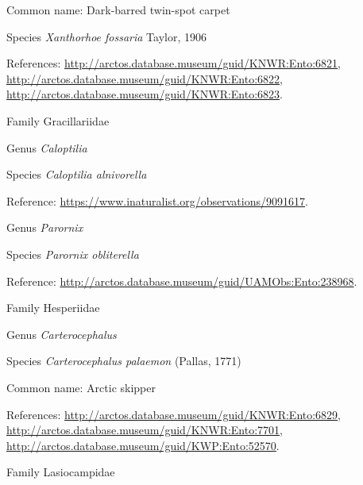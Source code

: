 \documentclass[9pt, article]{memoir}
\begin{document}
\begin{multicols}{2}
Common name: Dark-barred twin-spot carpet

\vspace{6pt}\noindent\hspace{36pt}Species \textit{Xanthorhoe fossaria} Taylor, 1906


References: 
\url{http://arctos.database.museum/guid/KNWR:Ento:6821}, 
\url{http://arctos.database.museum/guid/KNWR:Ento:6822}, 
\url{http://arctos.database.museum/guid/KNWR:Ento:6823}.

\vspace{6pt}\noindent\hspace{24pt}Family Gracillariidae


\vspace{6pt}\noindent\hspace{30pt}Genus \textit{Caloptilia}


\vspace{6pt}\noindent\hspace{36pt}Species \textit{Caloptilia alnivorella}


Reference: 
\url{https://www.inaturalist.org/observations/9091617}.

\vspace{6pt}\noindent\hspace{30pt}Genus \textit{Parornix}


\vspace{6pt}\noindent\hspace{36pt}Species \textit{Parornix obliterella}


Reference: 
\url{http://arctos.database.museum/guid/UAMObs:Ento:238968}.

\vspace{6pt}\noindent\hspace{24pt}Family Hesperiidae


\vspace{6pt}\noindent\hspace{30pt}Genus \textit{Carterocephalus}


\vspace{6pt}\noindent\hspace{36pt}Species \textit{Carterocephalus palaemon} (Pallas, 1771)


Common name: Arctic skipper

References: 
\url{http://arctos.database.museum/guid/KNWR:Ento:6829}, 
\url{http://arctos.database.museum/guid/KNWR:Ento:7701}, 
\url{http://arctos.database.museum/guid/KWP:Ento:52570}.

\vspace{6pt}\noindent\hspace{24pt}Family Lasiocampidae



\end{multicols}
\end{document}

